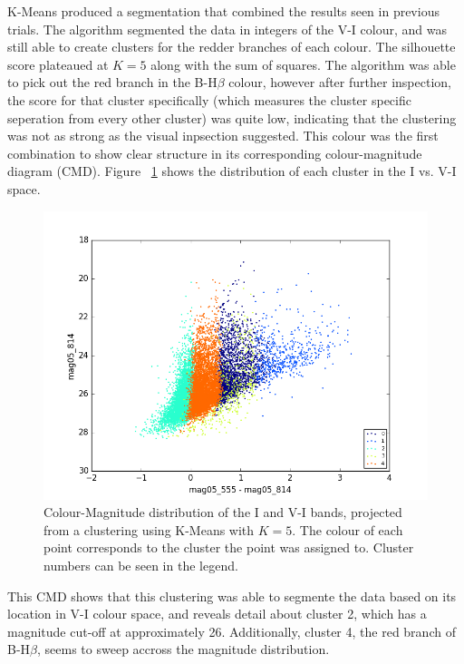K-Means produced a segmentation that combined the results seen in previous trials.
The algorithm segmented the data in integers of the V-I colour, and was still able to create clusters for the redder branches of each colour.
The silhouette score plateaued at $K=5$ along with the sum of squares.
The algorithm was able to pick out the red branch in the B-H$\beta$ colour, however after further inspection, the score for that cluster specifically (which measures the cluster specific seperation from every other cluster) was quite low, indicating that the clustering was not as strong as the visual inpsection suggested.
This colour was the first combination to show clear structure in its corresponding colour-magnitude diagram (CMD).
Figure ~\ref{fig:HBCMD} shows the distribution of each cluster in the I vs. V-I space.

\begin{figure}
\centering
\includegraphics[width=\linewidth]{figs/kmeans_CMD_5cl_mag05_555-mag05_814vsmag05_814}
\caption{Colour-Magnitude distribution of the I and V-I bands, projected from a clustering using K-Means with $K=5$. The colour of each point corresponds to the cluster the point was assigned to. Cluster numbers can be seen in the legend.}
\label{fig:HBCMD}
\end{figure}

This CMD shows that this clustering was able to segmente the data based on its location in V-I colour space, and reveals detail about cluster 2, which has a magnitude cut-off at approximately 26.
Additionally, cluster 4, the red branch of B-H$\beta$, seems to sweep accross the magnitude distribution. %

